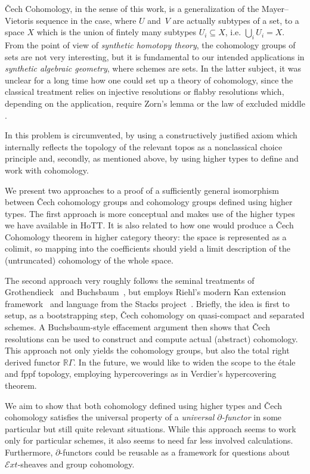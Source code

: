 \documentclass[letterpaper]{../util/easychair}
\newcommand{\notion}[1]{\emph{#1}\index{#1}}
\begin{document}
\v{C}ech Cohomology, in the sense of this work,
is a generalization of the Mayer--Vietoris sequence in the case, where $U$ and~$V$ are actually subtypes of a set,
to a space $X$ which is the union of fintely many subtypes $U_i\subseteq X$, i.e. $\bigcup_{i}U_i=X$.
From the point of view of \emph{synthetic homotopy theory}, the cohomology groups of sets are not very interesting,
but it is fundamental to our intended applications in \emph{synthetic algebraic geometry}, where schemes are sets.
In the latter subject, it was unclear for a long time how one could set up a theory of cohomology,
since the classical treatment relies on injective resolutions or flabby resolutions which, depending on the application, require Zorn's lemma or the law of excluded middle \cite{blechschmidt-flabby}.

In \cite{draft} this problem is circumvented,
by using a constructively justified axiom which internally reflects the topology of the relevant topos
as a nonclassical choice principle
and, secondly, as mentioned above, by using higher types to define and work with cohomology.

We present two approaches to a proof of a sufficiently general isomorphism between \v{C}ech cohomology groups
and cohomology groups defined using higher types.
The first approach is more conceptual and makes use of the higher types we have available in HoTT.
It is also related to how one would produce a \v{C}ech Cohomology theorem in higher category theory:
the space is represented as a colimit, so mapping into the coefficients should yield a limit description of
the (untruncated) cohomology of the whole space.

The second approach very roughly follows the seminal treatments of Grothendieck~\cite{tohoku1957} and Buchsbaum~\cite{buchsbaum}, but employs Riehl's modern Kan extension framework~\cite{riehl-cathtpy} and language from the Stacks project~\cite[Tag~05S7]{stacks-project}.
Briefly, the idea is first to setup, as a bootstrapping step, \v{C}ech
cohomology on quasi-compact and separated schemes. A Buchsbaum-style effacement argument
then shows that \v{C}ech resolutions can be used to construct and
compute actual (abstract) cohomology. This approach not only yields the
cohomology groups, but also the total right derived functor $\mathbb{R}\Gamma$.
In the future, we would like to widen the scope to the étale and fppf
topology, employing hypercoverings as in Verdier's hypercovering theorem.

We aim to show that both cohomology defined using higher types and \v{C}ech cohomology satisfies the universal property
of a \notion{universal $\partial$-functor} in some particular but still quite relevant situations.
While this approach seems to work only for particular schemes,
it also seems to need far less involved calculations.
Furthermore, $\partial$-functors could be reusable as a framework for questions about $\mathcal{E}\!xt$-sheaves and group cohomology.
\end{document}
